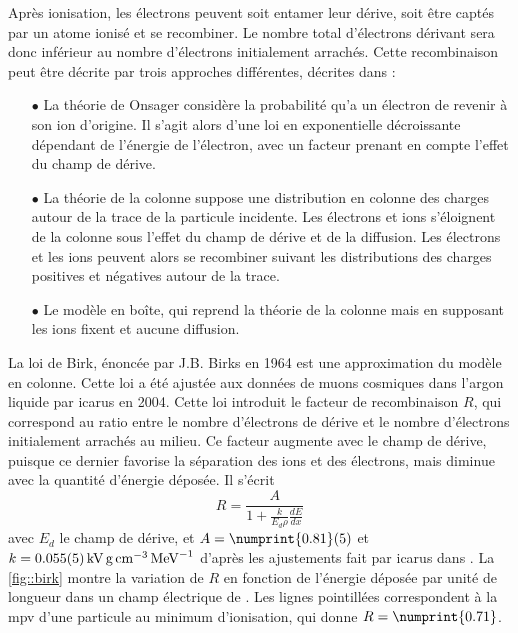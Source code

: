         Après ionisation, les électrons peuvent soit entamer leur dérive, soit être captés par un atome ionisé et se recombiner. Le nombre total d'électrons dérivant sera donc inférieur au nombre d'électrons initialement arrachés. Cette recombinaison peut être décrite par trois approches différentes, décrites dans \cite{Amoruso2004}:
        \begin{itemize}
          \item[$\bullet$] La théorie de Onsager considère la probabilité qu'a un électron de revenir à son ion d'origine. Il s'agit alors d'une loi en exponentielle décroissante dépendant de l'énergie de l'électron, avec un facteur prenant en compte l'effet du champ de dérive.
          \item[$\bullet$] La théorie de la colonne suppose une distribution en colonne des charges autour de la trace de la particule incidente. Les électrons et ions s'éloignent de la colonne sous l'effet du champ de dérive et de la diffusion. Les électrons et les ions peuvent alors se recombiner suivant les distributions des charges positives et négatives autour de la trace.
          \item[$\bullet$] Le modèle en boîte, qui reprend la théorie de la colonne mais en supposant les ions fixent et aucune diffusion.
        \end{itemize}
        La loi de Birk, énoncée par J.B. Birks en 1964\cite{Birk1964} est une approximation du modèle en colonne. Cette loi a été ajustée aux données de muons cosmiques dans l'argon liquide par \gls{icarus} en 2004\cite{Amoruso2004}. Cette loi introduit le facteur de recombinaison $R$, qui correspond au ratio entre le nombre d'électrons de dérive et le nombre d'électrons initialement arrachés au milieu. Ce facteur augmente avec le champ de dérive, puisque ce dernier favorise la séparation des ions et des électrons, mais diminue avec la quantité d'énergie déposée. Il s'écrit
        \begin{equation}\label{eq::birk}
          R=\frac{A}{1+\frac{k}{E_d \rho}\frac{dE}{dx}}
        \end{equation}
        avec $E_d$ le champ de dérive, et $A=\numprint{0.81}(5)$ et $k=\SI{0.055\pm0.005}{\kilo\volt\gram\per\centi\meter\cubed\per\mega\eV}$ d'après les ajustements fait par \gls{icarus} dans \cite{Amoruso2004}. La \autoref{fig::birk} montre la variation de $R$ en fonction de l'énergie déposée par unité de longueur dans un champ électrique de \driftfield{}. Les lignes pointillées correspondent à la \gls{mpv} d'une particule au minimum d'ionisation, qui donne $R=\numprint{0.71}$.

